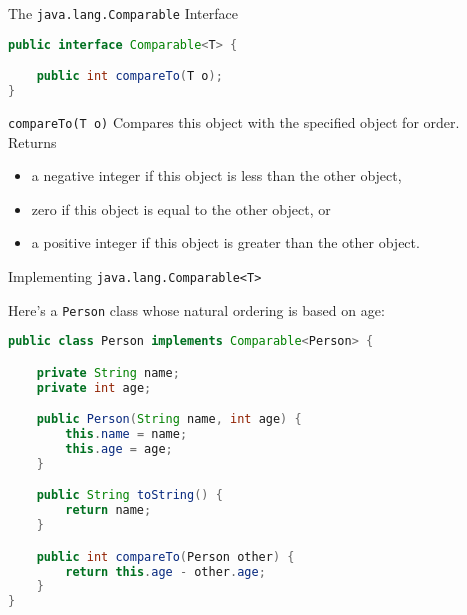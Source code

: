 \documentclass{beamer}
\begin{document}
\begin{frame}[fragile]{The {\tt java.lang.Comparable} Interface}


\begin{lstlisting}[language=Java]
public interface Comparable<T> {

    public int compareTo(T o);
}
\end{lstlisting}

{\tt compareTo(T o)} Compares this object with the specified object for order. Returns
\begin{itemize}
\item a negative integer if this object is less than the other object,
\item zero if this object is equal to the other object, or
\item a positive integer if this object is greater than the other object.
\end{itemize}

\end{frame}

\begin{frame}[fragile]{Implementing {\tt java.lang.Comparable<T>}}


Here's a {\tt Person} class whose natural ordering is based on age:
\begin{lstlisting}[language=Java]
public class Person implements Comparable<Person> {

    private String name;
    private int age;

    public Person(String name, int age) {
        this.name = name;
        this.age = age;
    }

    public String toString() {
        return name;
    }

    public int compareTo(Person other) {
        return this.age - other.age;
    }
}
\end{lstlisting}


\end{frame}
\end{document}

